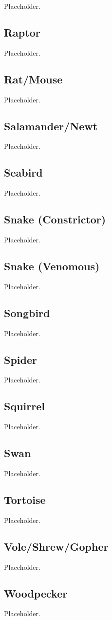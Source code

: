 Placeholder.

\subsection{Raptor}

Placeholder.

\subsection{Rat/Mouse}

Placeholder.

\subsection{Salamander/Newt}

Placeholder.

\subsection{Seabird}

Placeholder.

\subsection{Snake (Constrictor)}

Placeholder.

\subsection{Snake (Venomous)}

Placeholder.

\subsection{Songbird}

Placeholder.

\subsection{Spider}

Placeholder.

\subsection{Squirrel}

Placeholder.

\subsection{Swan}

Placeholder.

\subsection{Tortoise}

Placeholder.

\subsection{Vole/Shrew/Gopher}

Placeholder.

\subsection{Woodpecker}

Placeholder.
